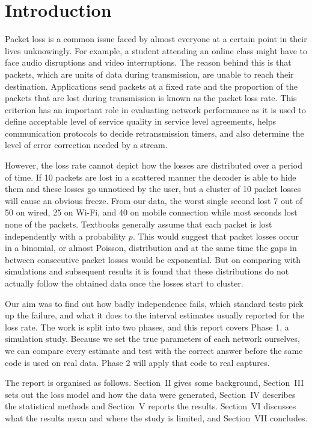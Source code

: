 \documentclass[conference]{IEEEtran}
\begin{document}
\section{Introduction}
Packet loss is a common issue faced by almost everyone at a certain point in their lives unknowingly. For example, a student attending an online class might have to face audio disruptions and video interruptions. The reason behind this is that packets, which are units of data during transmission, are unable to reach their destination. Applications send packets at a fixed rate and the proportion of the packets that are lost during transmission is known as the packet loss rate. This criterion has an important role in evaluating network performance as it is used to define acceptable level of service quality in service level agreements, helps communication protocols to decide retransmission timers, and also determine the level of error correction needed by a stream.

However, the loss rate cannot depict how the losses are distributed over a period of time. If 10 packets are lost in a scattered manner the decoder is able to hide them and these losses go unnoticed by the user, but a cluster of 10 packet losses will cause an obvious freeze. From our data, the worst single second lost 7 out of 50 on wired, 25 on Wi-Fi, and 40 on mobile connection while most seconds lost none of the packets. Textbooks generally assume that each packet is lost independently with a probability $p$. This would suggest that packet losses occur in a binomial, or almost Poisson, distribution and at the same time the gaps in between consecutive packet losses would be exponential. But on comparing with simulations and subsequent results it is found that these distributions do not actually follow the obtained data once the losses start to cluster.

Our aim was to find out how badly independence fails, which standard tests pick up the failure, and what it does to the interval estimates usually reported for the loss rate. The work is split into two phases, and this report covers Phase 1, a simulation study. Because we set the true parameters of each network ourselves, we can compare every estimate and test with the correct answer before the same code is used on real data. Phase 2 will apply that code to real captures.

The report is organised as follows. Section~II gives some background, Section~III sets out the loss model and how the data were generated, Section~IV describes the statistical methods and Section~V reports the results. Section~VI discusses what the results mean and where the study is limited, and Section~VII concludes.
\end{document}
